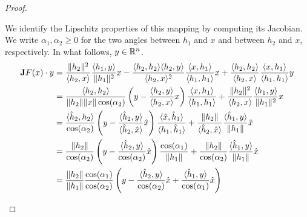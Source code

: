 \documentclass[10pt,a4paper]{article}
\begin{document}
\begin{proof}
\begin{itemize}
        We identify the Lipschitz properties of this mapping by computing its Jacobian. 
        We write $\alpha_1, \alpha_2 \geq 0$ for the two angles between $h_1$ and $x$ and between $h_2$ and $x$, respectively. 
        In what follows, $y \in {\mathbb R}^{n}$.
        \begin{align*}
            \Jacobian F(x) \cdot y
            &=
            \frac{ \| h_2 \|^{2} }{ \langle h_2, x \rangle }
            \frac{ \langle h_1, y \rangle }{ \| h_1 \|^{2} }
            x
            - 
            \frac{ \langle h_2, h_2 \rangle \langle h_2, y \rangle }{ \langle h_2, x \rangle^{2} }
            \frac{ \langle x, h_1 \rangle }{ \langle h_1, h_1 \rangle }
            x 
            +
            \frac{ \langle h_2, h_2 \rangle }{ \langle h_2, x \rangle }
            \frac{ \langle x, h_1 \rangle }{ \langle h_1, h_1 \rangle }
            y 
            \\&=
            \frac{ \langle h_2, h_2 \rangle }{ \|h_2\| \|x\| \cos(\alpha_2) }
            \left( y - \frac{ \langle h_2, y \rangle }{ \langle h_2, x \rangle } x \right)
            \frac{ \langle x, h_1 \rangle }{ \langle h_1, h_1 \rangle }
            +
            \frac{ \| h_2 \|^{2} }{ \langle h_2, x \rangle }
            \frac{ \langle h_1, y \rangle }{ \| h_1 \|^{2} }
            x
            \\&=
            \frac{ \langle \hat h_2, h_2 \rangle }{ \cos(\alpha_2) }
            \left( y - \frac{ \langle \hat h_2, y \rangle }{ \langle \hat h_2, \hat x \rangle } \hat x \right)
            \frac{ \langle \hat x, \hat h_1 \rangle }{ \langle h_1, \hat h_1 \rangle }
            +
            \frac{ \| h_2 \| }{ \langle \hat h_2, \hat x \rangle }
            \frac{ \langle \hat h_1, y \rangle }{ \| h_1 \| }
            \hat x
            \\&=
            \frac{ \| h_2 \| }{ \cos(\alpha_2) }
            \left( y - \frac{ \langle \hat h_2, y \rangle }{ \cos(\alpha_2) } \hat x \right)
            \frac{ \cos(\alpha_1) }{ \| h_1 \| }
            +
            \frac{ \| h_2 \| }{ \cos(\alpha_2) }
            \frac{ \langle \hat h_1, y \rangle }{ \| h_1 \| }
            \hat x
            \\&=
            \frac{ \| h_2 \| }{ \| h_1 \| }
            \frac{ \cos(\alpha_1) }{ \cos(\alpha_2) }
            \left( 
                y 
                - 
                \frac{ \langle \hat h_2, y \rangle }{ \cos(\alpha_2) } \hat x 
                + 
                \frac{ \langle \hat h_1, y \rangle }{ \cos(\alpha_1) } \hat x 
            \right)

\end{align*}
\end{itemize}
\end{proof}
\end{document}
